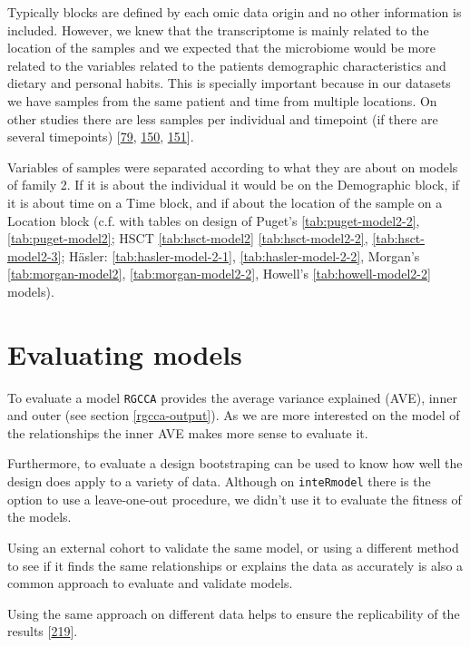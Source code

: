 \documentclass[
  a4paper,
]{book}
\begin{document}
Typically blocks are defined by each omic data origin and no other information is included.
However, we knew that the transcriptome is mainly related to the location of the samples and we expected that the microbiome would be more related to the variables related to the patients demographic characteristics and dietary and personal habits.
This is specially important because in our datasets we have samples from the same patient and time from multiple locations.
On other studies there are less samples per individual and timepoint (if there are several timepoints) {[}\protect\hyperlink{ref-hasler_uncoupling_2016}{79}, \protect\hyperlink{ref-morgan2015}{150}, \protect\hyperlink{ref-howell2018}{151}{]}.

Variables of samples were separated according to what they are about on models of family 2.
If it is about the individual it would be on the Demographic block, if it is about time on a Time block, and if about the location of the sample on a Location block (c.f. with tables on design of Puget's \ref{tab:puget-model2-2}, \ref{tab:puget-model2}; HSCT \ref{tab:hsct-model2} \ref{tab:hsct-model2-2}, \ref{tab:hsct-model2-3}; Häsler: \ref{tab:hasler-model-2-1}, \ref{tab:hasler-model-2-2}, Morgan's \ref{tab:morgan-model2}, \ref{tab:morgan-model2-2}, Howell's \ref{tab:howell-model2-2} models).

\hypertarget{evaluating-models}{%
\section{Evaluating models}\label{evaluating-models}}

To evaluate a model \texttt{RGCCA} provides the average variance explained (AVE), inner and outer (see section \ref{rgcca-output}).
As we are more interested on the model of the relationships the inner AVE makes more sense to evaluate it.

Furthermore, to evaluate a design bootstraping can be used to know how well the design does apply to a variety of data.
Although on \texttt{inteRmodel} there is the option to use a leave-one-out procedure, we didn't use it to evaluate the fitness of the models.

Using an external cohort to validate the same model, or using a different method to see if it finds the same relationships or explains the data as accurately is also a common approach to evaluate and validate models.

Using the same approach on different data helps to ensure the replicability of the results {[}\protect\hyperlink{ref-community2021}{219}{]}.
\end{document}
